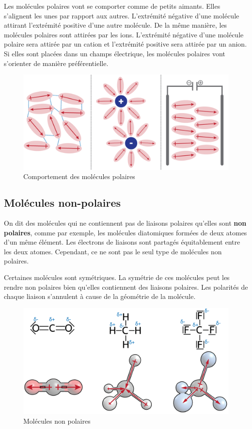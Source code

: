 \documentclass[
  11pt,
  a4paper,
  openany]{book}
\begin{document}
Les molécules polaires vont se comporter comme de petits aimants. Elles s'alignent les unes par rapport aux autres. L'extrémité négative d'une molécule attirant l'extrémité positive d'une autre molécule. De la même manière, les molécules polaires sont attirées par les ions. L'extrémité négative d'une molécule polaire sera attirée par un cation et l'extrémité positive sera attirée par un anion. Si elles sont placées dans un champs électrique, les molécules polaires vont s'orienter de manière préférentielle.

\begin{figure}

{\centering \includegraphics[width=0.6\linewidth]{images/dipole-3} 

}

\caption{Comportement des molécules polaires}\label{fig:dipole-3}
\end{figure}

\hypertarget{moluxe9cules-non-polaires}{%
\subsection{Molécules non-polaires}\label{moluxe9cules-non-polaires}}

On dit des molécules qui ne contiennent pas de liaisons polaires qu'elles sont \textbf{non polaires}, comme par exemple, les molécules diatomiques formées de deux atomes d'un même élément. Les électrons de liaisons sont partagés équitablement entre les deux atomes. Cependant, ce ne sont pas le seul type de molécules non polaires.

Certaines molécules sont symétriques. La symétrie de ces molécules peut les rendre non polaires bien qu'elles contiennent des liaisons polaires. Les polarités de chaque liaison s'annulent à cause de la géométrie de la molécule.

\begin{figure}

{\centering \includegraphics[width=0.5\linewidth]{images/dipole-4} 

}

\caption{Molécules non polaires}\label{fig:dipole-4}
\end{figure}
\end{document}
